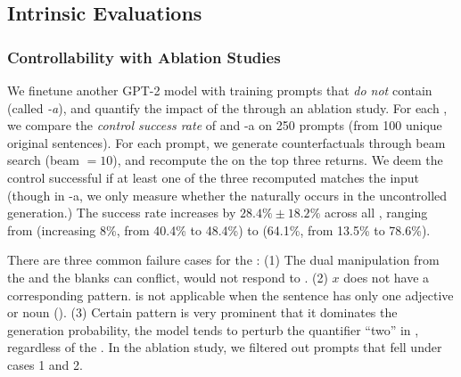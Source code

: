 \subsection{Intrinsic Evaluations}
\label{appendix:intrinsic}






\subsubsection{Controllability with Ablation Studies}
\label{appendix:ablation_control}

We finetune another GPT-2 model with training prompts that \emph{do not} contain \tagstrs (called \emph{\sysname-a}), and quantify the impact of the \tagstrshorts through an ablation study.
For each \tagstr, we compare the \emph{control success rate} of \sysname and \sysname-a on 250 prompts (from 100 unique original sentences).
For each prompt, we generate counterfactuals through beam search (beam $=10$), and recompute the \tagstrshorts on the top three returns.
We deem the control successful if at least one of the three recomputed \tagstrshorts matches the input (though in \sysname-a, we only measure whether the \tagstrshort naturally occurs in the uncontrolled generation.)
The success rate increases by $28.4\% \pm 18.2\%$ across all \tagstrs, ranging from  (increasing 8\%, from 40.4\% to 48.4\%) to  (64.1\%, from 13.5\% to 78.6\%).

There are three common failure cases for the \tagstrshorts:
(1) The dual manipulation from the \tagstrs and the blanks can conflict, \eg {} would not respond to .
(2) $x$ does not have a corresponding pattern.  is not applicable when the sentence has only one adjective or noun (\eg {}).
(3) Certain pattern is very prominent that it dominates the generation probability, \eg the model tends to perturb the quantifier ``two'' in , regardless of the \tagstrshort.
In the ablation study, we filtered out prompts that fell under cases 1 and 2.







